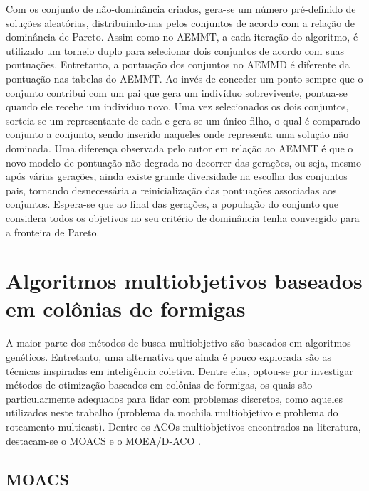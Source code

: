 Com os conjunto de não-dominância criados, gera-se um número pré-definido de soluções aleatórias, distribuindo-nas pelos conjuntos de acordo com a relação de dominância de Pareto. Assim como no AEMMT, a cada iteração do algoritmo, é utilizado um torneio duplo para selecionar dois conjuntos de acordo com suas pontuações. Entretanto, a pontuação dos conjuntos no AEMMD é diferente da pontuação nas tabelas do AEMMT. Ao invés de conceder um ponto sempre que o conjunto contribui com um pai que gera um indivíduo sobrevivente, pontua-se quando ele recebe um indivíduo novo. Uma vez selecionados os dois conjuntos, sorteia-se um representante de cada e gera-se um único filho, o qual é comparado conjunto a conjunto, sendo inserido naqueles onde representa uma solução não dominada. Uma diferença observada pelo autor em relação ao AEMMT é que o novo modelo de pontuação não degrada no decorrer das gerações, ou seja, mesmo após várias gerações, ainda existe grande diversidade na escolha dos conjuntos pais, tornando desnecessária a reinicialização das pontuações associadas aos conjuntos. Espera-se que ao final das gerações, a população do conjunto que considera todos os objetivos no seu critério de dominância tenha convergido para a fronteira de Pareto. 

\section{Algoritmos multiobjetivos baseados em colônias de formigas}

A maior parte dos métodos de busca multiobjetivo são baseados em algoritmos genéticos. Entretanto, uma alternativa que ainda é pouco explorada são as técnicas inspiradas em inteligência coletiva. Dentre elas, optou-se por investigar métodos de otimização baseados em colônias de formigas, os quais são particularmente adequados para lidar com problemas discretos, como aqueles utilizados neste trabalho (problema da mochila multiobjetivo e problema do roteamento multicast). Dentre os ACOs multiobjetivos encontrados na literatura, destacam-se o MOACS \cite{Baran2003} e o MOEA/D-ACO \cite{Ke2013}.

\subsection{MOACS}


